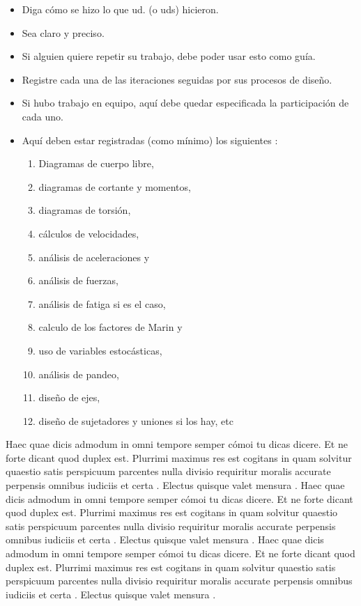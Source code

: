 \documentclass[10pt]{article}
\begin{document}
\begin{itemize}
\item Diga cómo se hizo lo que ud. (o uds) hicieron.
\item  Sea claro y preciso.
\item  Si alguien quiere repetir su trabajo, debe poder usar esto como guía.
\item  Registre cada una de las iteraciones seguidas por sus procesos de diseño.
\item  Si hubo trabajo en equipo, aquí debe quedar especificada la participación de cada uno.

\item Aquí deben estar registradas (como mínimo) los siguientes :
\begin{enumerate}
\item  Diagramas de cuerpo libre,
\item  diagramas de cortante y momentos,
\item  diagramas de torsión,
\item  cálculos de velocidades,
\item  análisis de aceleraciones y
\item  análisis de fuerzas,
\item  análisis de fatiga si es el caso,
\item  calculo de los factores de Marin y
\item  uso de variables estocásticas,
\item análisis de pandeo,
\item  diseño de ejes,
\item  diseño de sujetadores y uniones si los hay, etc
\end{enumerate}



\end{itemize}
Haec quae dicis admodum in omni tempore semper cómoi tu dicas dicere. Et ne forte dicant quod duplex est. Plurrimi maximus res est cogitans in quam solvitur quaestio satis perspicuum parcentes nulla divisio requiritur moralis accurate perpensis omnibus iudiciis et certa . Electus quisque valet mensura .
Haec quae dicis admodum in omni tempore semper cómoi tu dicas dicere. Et ne forte dicant quod duplex est. Plurrimi maximus res est cogitans in quam solvitur quaestio satis perspicuum parcentes nulla divisio requiritur moralis accurate perpensis omnibus iudiciis et certa . Electus quisque valet mensura .
Haec quae dicis admodum in omni tempore semper cómoi tu dicas dicere. Et ne forte dicant quod duplex est. Plurrimi maximus res est cogitans in quam solvitur quaestio satis perspicuum parcentes nulla divisio requiritur moralis accurate perpensis omnibus iudiciis et certa . Electus quisque valet mensura .
\end{document}
